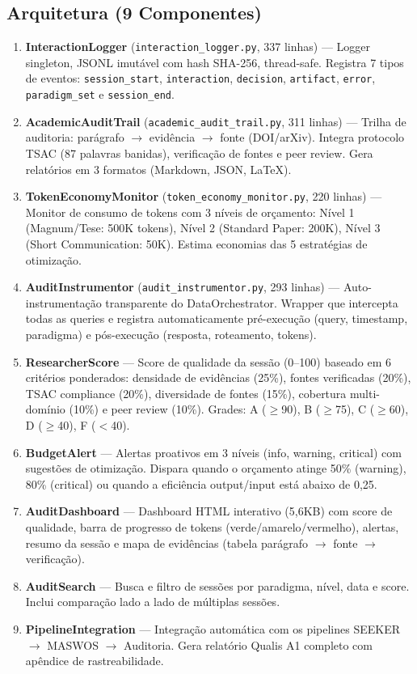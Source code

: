 \documentclass[12pt,a4paper]{article}
\begin{document}
\subsection{Arquitetura (9 Componentes)}

\begin{enumerate}[itemsep=1pt]
  \item \textbf{InteractionLogger} (\texttt{interaction\_logger.py}, 337 linhas) --- Logger singleton, JSONL imutável com hash SHA-256, thread-safe. Registra 7 tipos de eventos: \texttt{session\_start}, \texttt{interaction}, \texttt{decision}, \texttt{artifact}, \texttt{error}, \texttt{paradigm\_set} e \texttt{session\_end}.
  \item \textbf{AcademicAuditTrail} (\texttt{academic\_audit\_trail.py}, 311 linhas) --- Trilha de auditoria: parágrafo $\rightarrow$ evidência $\rightarrow$ fonte (DOI/arXiv). Integra protocolo TSAC (87 palavras banidas), verificação de fontes e peer review. Gera relatórios em 3 formatos (Markdown, JSON, LaTeX).
  \item \textbf{TokenEconomyMonitor} (\texttt{token\_economy\_monitor.py}, 220 linhas) --- Monitor de consumo de tokens com 3 níveis de orçamento: Nível 1 (Magnum/Tese: 500K tokens), Nível 2 (Standard Paper: 200K), Nível 3 (Short Communication: 50K). Estima economias das 5 estratégias de otimização.
  \item \textbf{AuditInstrumentor} (\texttt{audit\_instrumentor.py}, 293 linhas) --- Auto-instrumentação transparente do DataOrchestrator. Wrapper que intercepta todas as queries e registra automaticamente pré-execução (query, timestamp, paradigma) e pós-execução (resposta, roteamento, tokens).
  \item \textbf{ResearcherScore} --- Score de qualidade da sessão (0--100) baseado em 6 critérios ponderados: densidade de evidências (25\%), fontes verificadas (20\%), TSAC compliance (20\%), diversidade de fontes (15\%), cobertura multi-domínio (10\%) e peer review (10\%). Grades: A ($\geq$90), B ($\geq$75), C ($\geq$60), D ($\geq$40), F ($<$40).
  \item \textbf{BudgetAlert} --- Alertas proativos em 3 níveis (info, warning, critical) com sugestões de otimização. Dispara quando o orçamento atinge 50\% (warning), 80\% (critical) ou quando a eficiência output/input está abaixo de 0,25.
  \item \textbf{AuditDashboard} --- Dashboard HTML interativo (5,6KB) com score de qualidade, barra de progresso de tokens (verde/amarelo/vermelho), alertas, resumo da sessão e mapa de evidências (tabela parágrafo $\rightarrow$ fonte $\rightarrow$ verificação).
  \item \textbf{AuditSearch} --- Busca e filtro de sessões por paradigma, nível, data e score. Inclui comparação lado a lado de múltiplas sessões.
  \item \textbf{PipelineIntegration} --- Integração automática com os pipelines SEEKER $\rightarrow$ MASWOS $\rightarrow$ Auditoria. Gera relatório Qualis A1 completo com apêndice de rastreabilidade.
\end{enumerate}
\end{document}
